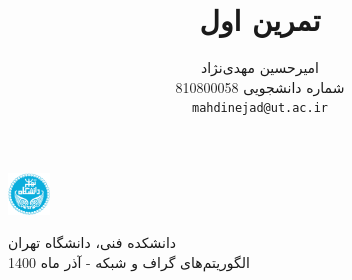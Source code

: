 \documentclass{article}
\title{تمرین اول}
\author{%
  امیرحسین مهدی‌نژاد\\
  شماره دانشجویی 810800058\\
  \texttt{mahdinejad@ut.ac.ir} \\
}
\begin{document}
\begin{minipage}{0.1\textwidth}%
\includegraphics[width=1.1cm]{Photos/UT_logo.png}
\end{minipage}%
\hfill%
\begin{minipage}{0.9\textwidth}\raggedleft
دانشکده فنی، دانشگاه تهران\\
الگوریتم‌های گراف و شبکه - 
آذر
ماه 1400\\
\end{minipage}


\makepertitle


\end{document}
